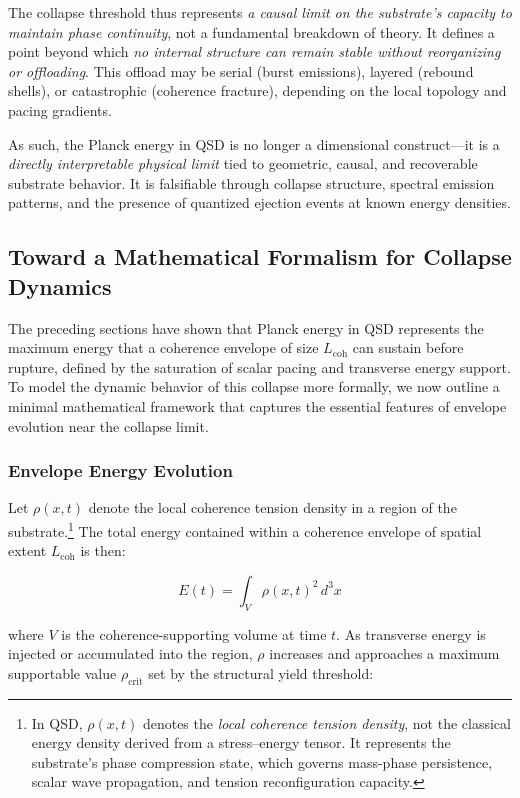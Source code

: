 \documentclass[entropy,article,submit,pdftex,moreauthors]{Definitions/mdpi}
\begin{document}
The collapse threshold thus represents \textit{a causal limit on the substrate’s capacity to maintain phase continuity}, not a fundamental breakdown of theory. It defines a point beyond which \textit{no internal structure can remain stable without reorganizing or offloading}. This offload may be serial (burst emissions), layered (rebound shells), or catastrophic (coherence fracture), depending on the local topology and pacing gradients.

As such, the Planck energy in QSD is no longer a dimensional construct---it is a \textit{directly interpretable physical limit} tied to geometric, causal, and recoverable substrate behavior. It is falsifiable through collapse structure, spectral emission patterns, and the presence of quantized ejection events at known energy densities.
\subsection{Toward a Mathematical Formalism for Collapse Dynamics}

The preceding sections have shown that Planck energy in QSD represents the maximum energy that a coherence envelope of size $L_{\text{coh}}$ can sustain before rupture, defined by the saturation of scalar pacing and transverse energy support. To model the dynamic behavior of this collapse more formally, we now outline a minimal mathematical framework that captures the essential features of envelope evolution near the collapse limit.

\subsubsection{Envelope Energy Evolution}

Let \( \rho(x, t) \) denote the local coherence tension density in a region of the substrate.\footnote{In QSD, \( \rho(x,t) \) denotes the \textit{local coherence tension density}, not the classical energy density derived from a stress–energy tensor. It represents the substrate’s phase compression state, which governs mass-phase persistence, scalar wave propagation, and tension reconfiguration capacity.} The total energy contained within a coherence envelope of spatial extent $L_{\text{coh}}$ is then:


\begin{equation}
E(t) = \int_{V} \rho(x,t)^2 \, d^3x
\end{equation}

where $V$ is the coherence-supporting volume at time $t$. As transverse energy is injected or accumulated into the region, $\rho$ increases and approaches a maximum supportable value $\rho_{\text{crit}}$ set by the structural yield threshold:
\end{document}
